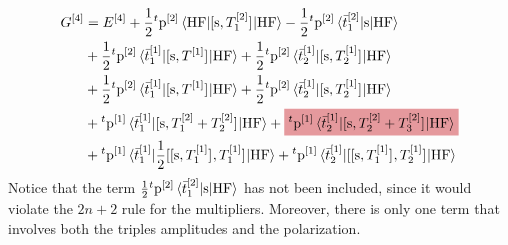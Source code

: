 \begin{equation}
  \begin{aligned}
  G^{[4]}
  &= E^{[4]}
    + \frac{1}{2}{}^t\p^{[2]}
      \braket{\mathrm{HF} | \commutator{\s}{T_1^{[2]}} | \mathrm{HF}}
    - \frac{1}{2}{}^t\p^{[2]}
       \braket{\tbar{1}^{[2]}| \s | \mathrm{HF}} \\
    &+ \frac{1}{2}{}^t\p^{[2]}
      \braket{\tbar{1}^{[1]}| \commutator{\s}{T^{[1]}} | \mathrm{HF} }
    + \frac{1}{2}{}^t\p^{[2]}
       \braket{\tbar{2}^{[1]}| \commutator{\s}{T_2^{[1]}} | \mathrm{HF} } \\
    &+ \frac{1}{2}{}^t\p^{[2]}\braket{\tbar{1}^{[1]}| \commutator{\s}{T^{[1]}} | \mathrm{HF} }
    + \frac{1}{2}{}^t\p^{[2]}\braket{\tbar{2}^{[1]}| \commutator{\s}{T_2^{[1]}} | \mathrm{HF} } \\
    &+
    {}^t\p^{[1]}
    \braket{\tbar{1}^{[1]} | \commutator{\s}{T_1^{[2]} + T_2^{[2]}} | \mathrm{HF}}
    +
    \highlight{PMS1797}{
    {}^t\p^{[1]}
    \braket{\tbar{2}^{[1]} | \commutator{\s}{T_2^{[2]} + T_3^{[2]}} | \mathrm{HF}}
    }
    \\
    &+
    {}^t\p^{[1]}
    \braket{\tbar{1}^{[1]} |
    \frac{1}{2}
    \commutator{\commutator{\s}{T_1^{[1]}}}{T_1^{[1]}}
    |
    \mathrm{HF}}
    +
    {}^t\p^{[1]}
    \braket{\tbar{2}^{[1]} |
    \commutator{\commutator{\s}{T_1^{[1]}}}{T_2^{[1]}}
    |
    \mathrm{HF}}
  \end{aligned}
\end{equation}
Notice that the term $\frac{1}{2}{}^t\mathrm{p}^{[2]}\braket{\bar{t}_{1}^{[2]}| \mathrm{s} | \mathrm{HF}}$
has not been included, since it would violate the $2n+2$ rule for the
multipliers. Moreover, there is only one term that involves both the
triples amplitudes and the polarization.

